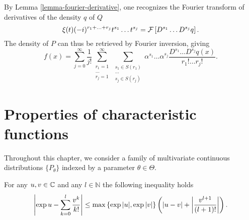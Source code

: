 By Lemma \ref{lemma-fourier-derivative}, one recognizes the Fourier transform of derivatives of the density $q$ of $Q$
\begin{equation*}
    \xi(t) (-i)^{r_1 + \ldots + r_j}
        t^{s_1} \ldots t^{s_j} = \mathcal{F} \left[ D^{s_1} \ldots D^{s_j} q \right].
\end{equation*}
The density of $P$ can thus be retrieved by Fourier inversion, giving
\begin{equation*}
    f(x) 
    = \sum_{j=0}^\infty \frac{1}{j!} 
        \sum_{\substack{r_1 = 1\\ \ldots \\r_j = 1}}^\infty
        \sum_{\substack{s_1 \in S(r_1)\\ \ldots \\s_j \in S(r_j)}}
        \alpha^{s_1}\ldots\alpha^{s_j}
        \frac{
            D^{s_1} \ldots D^{s_j} q(x)
        }{
            r_1! \ldots r_j!
        }.
\end{equation*}



\section{Properties of characteristic functions}

Throughout this chapter, we consider a family of multivariate continuous distributions $\{ P_\theta \}$ indexed by a parameter $\theta \in \Theta$.



\begin{lemma} \label{lemma-series}
    For any $u, v \in \mathbb{C}$ and any $l \in \mathbb{N}$ the following inequality holds
    \begin{equation}
        \left|\exp{u} - \sum_{k=0}^l \frac{v^k}{k!}\right| \leq \max \left\{ \exp{|u|}, \exp{|v|} \right\}\left(\left|u - v\right| + \left|\frac{v^{l+1}}{(l+1)!}\right|\right).
    \end{equation}
\end{lemma}


